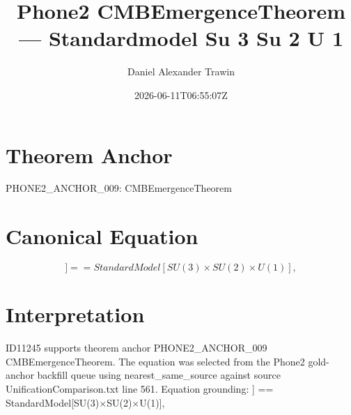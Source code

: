 \documentclass[11pt]{article}
\title{Phone2 CMBEmergenceTheorem — Standardmodel Su 3 Su 2 U 1}
\author{Daniel Alexander Trawin}
\date{2026-06-11T06:55:07Z}
\begin{document}
\maketitle
\section*{Theorem Anchor}
PHONE2_ANCHOR_009: CMBEmergenceTheorem
\section*{Canonical Equation}
\[
] == StandardModel[SU(3)×SU(2)×U(1)],
\]
\section*{Interpretation}
ID11245 supports theorem anchor PHONE2_ANCHOR_009 CMBEmergenceTheorem. The equation was selected from the Phone2 gold-anchor backfill queue using nearest_same_source against source UnificationComparison.txt line 561. Equation grounding: ] == StandardModel[SU(3)×SU(2)×U(1)],
\end{document}
